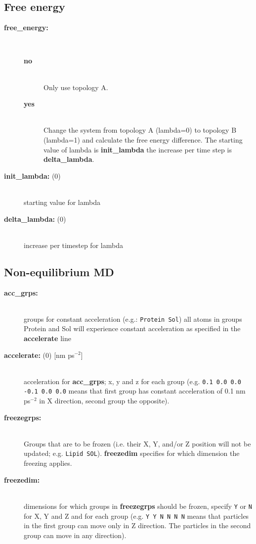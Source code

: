 \subsection{ Free energy}
\begin{description}
\item[{\bf free\_energy:}]\mbox{}\\
\vspace{-2ex}\begin{description}
\item[{\bf no}]\mbox{}\\
Only use topology A. 
\item[{\bf yes}]\mbox{}\\
Change the system from topology A (lambda=0) to topology B (lambda=1)
and calculate the free energy difference.
The starting value of lambda is {\bf init\_lambda} the increase
per time step is {\bf delta\_lambda}.
\end{description}
\item[{\bf init\_lambda: }(0)]\mbox{}\\
starting value for lambda
\item[{\bf delta\_lambda: }(0)]\mbox{}\\
increase per timestep for lambda
\end{description}

\subsection{ Non-equilibrium MD}
\begin{description}
\item[{\bf acc\_grps: }]\mbox{}\\
groups for constant acceleration (e.g.: {\tt Protein Sol})
all atoms in groups Protein and Sol will experience constant acceleration
as specified in the {\bf accelerate} line
\item[{\bf accelerate: }(0) {[nm ps$^{-2}$]}]\mbox{}\\
acceleration for {\bf acc\_grps}; x, y and z for each group
(e.g. {\tt 0.1 0.0 0.0 -0.1 0.0 0.0} means that first group has constant 
acceleration of 0.1 nm ps$^{-2}$ in X direction, second group the 
opposite).
\item[{\bf freezegrps: }]\mbox{}\\
Groups that are to be frozen (i.e. their X, Y, and/or Z position will
not be updated; e.g. {\tt Lipid SOL}). {\bf freezedim} specifies for
which dimension the freezing applies.
\item[{\bf freezedim: }]\mbox{}\\
dimensions for which groups in {\bf freezegrps} should be frozen, 
specify {\tt Y} or {\tt N} for X, Y and Z and for each group
(e.g. {\tt Y Y N N N N} means that particles in the first group 
can move only in Z direction. The particles in the second group can 
move in any direction).
\end{description}

